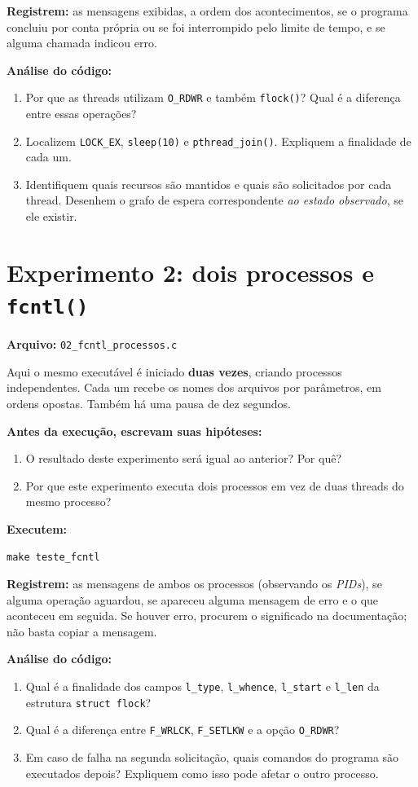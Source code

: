 \documentclass[11pt,a4paper]{article}
\begin{document}
\textbf{Registrem:} as mensagens exibidas, a ordem dos acontecimentos, se o programa concluiu por conta própria ou se foi interrompido pelo limite de tempo, e se alguma chamada indicou erro.

\textbf{Análise do código:}
\begin{enumerate}[label=\arabic*.,start=1]
\item Por que as threads utilizam \texttt{O\_RDWR} e também \texttt{flock()}? Qual é a diferença entre essas operações?
\item Localizem \texttt{LOCK\_EX}, \texttt{sleep(10)} e \texttt{pthread\_join()}. Expliquem a finalidade de cada um.
\item Identifiquem quais recursos são mantidos e quais são solicitados por cada thread. Desenhem o grafo de espera correspondente \emph{ao estado observado}, se ele existir.
\end{enumerate}

\section{Experimento 2: dois processos e \texttt{fcntl()}}
\textbf{Arquivo:} \texttt{02\_fcntl\_processos.c}

Aqui o mesmo executável é iniciado \textbf{duas vezes}, criando processos independentes. Cada um recebe os nomes dos arquivos por parâmetros, em ordens opostas. Também há uma pausa de dez segundos.

\textbf{Antes da execução, escrevam suas hipóteses:}
\begin{enumerate}[label=H\arabic*.,start=3]
\item O resultado deste experimento será igual ao anterior? Por quê?
\item Por que este experimento executa dois processos em vez de duas threads do mesmo processo?
\end{enumerate}

\textbf{Executem:}
\begin{lstlisting}[style=terminal]
make teste_fcntl
\end{lstlisting}
\textbf{Registrem:} as mensagens de ambos os processos (observando os \emph{PIDs}), se alguma operação aguardou, se apareceu alguma mensagem de erro e o que aconteceu em seguida. Se houver erro, procurem o significado na documentação; não basta copiar a mensagem.

\textbf{Análise do código:}
\begin{enumerate}[label=\arabic*.,start=4]
\item Qual é a finalidade dos campos \texttt{l\_type}, \texttt{l\_whence}, \texttt{l\_start} e \texttt{l\_len} da estrutura \texttt{struct flock}?
\item Qual é a diferença entre \texttt{F\_WRLCK}, \texttt{F\_SETLKW} e a opção \texttt{O\_RDWR}?
\item Em caso de falha na segunda solicitação, quais comandos do programa são executados depois? Expliquem como isso pode afetar o outro processo.
\end{enumerate}
\end{document}
